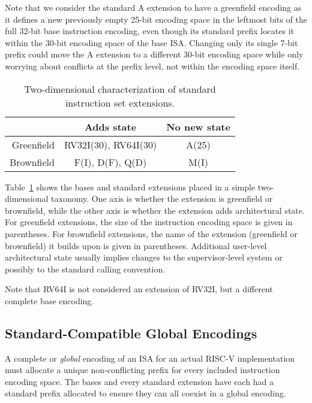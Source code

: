 Note that we consider the standard A extension to have a greenfield
encoding as it defines a new previously empty 25-bit encoding space in
the leftmost bits of the full 32-bit base instruction encoding, even
though its standard prefix locates it within the 30-bit encoding space
of the base ISA.  Changing only its single 7-bit prefix could move the
A extension to a different 30-bit encoding space while only worrying
about conflicts at the prefix level, not within the encoding space
itself.

\begin{table}[H]
{
\begin{center}
\begin{tabular}{|r|c|c|}
\hline
 & Adds state & No new state \\ \hline
Greenfield & RV32I(30), RV64I(30) & A(25) \\\hline
Brownfield & F(I), D(F), Q(D) & M(I) \\
\hline
\end{tabular}
\end{center}
}
\caption{Two-dimensional characterization of standard instruction set
  extensions.}
\label{exttax}
\end{table}

Table~\ref{exttax} shows the bases and standard extensions placed in a
simple two-dimensional taxonomy.  One axis is whether the extension is
greenfield or brownfield, while the other axis is whether the
extension adds architectural state.  For greenfield extensions, the
size of the instruction encoding space is given in parentheses.  For
brownfield extensions, the name of the extension (greenfield or
brownfield) it builds upon is given in parentheses.  Additional
user-level architectural state usually implies changes to the
supervisor-level system or possibly to the standard calling
convention.

Note that RV64I is not considered an extension of RV32I, but a
different complete base encoding.

\vspace{-0.2in}
\subsection*{Standard-Compatible Global Encodings}

A complete or {\em global} encoding of an ISA for an actual RISC-V
implementation must allocate a unique non-conflicting prefix for every
included instruction encoding space.  The bases and every standard
extension have each had a standard prefix allocated to ensure they can
all coexist in a global encoding.


